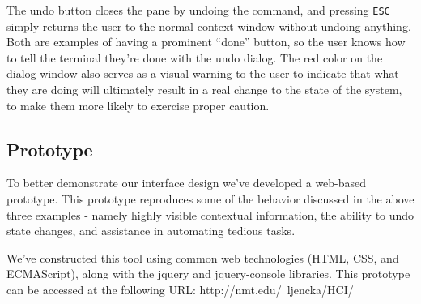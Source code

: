 The undo button closes the pane by undoing the command, and pressing
\texttt{ESC} simply returns the user to the normal context window without
undoing anything. Both are examples of having a prominent ``done'' button, so
the user knows how to tell the terminal they're done with the undo dialog. The
red color on the dialog window also serves as a visual warning to the user to
indicate that what they are doing will ultimately result in a real change to the
state of the system, to make them more likely to exercise proper caution.

\subsection{Prototype}
To better demonstrate our interface design we've developed a web-based
prototype. This prototype reproduces some of the behavior discussed in the
above three examples - namely highly visible contextual information, the ability
to undo state changes, and assistance in automating tedious tasks.

We've constructed this tool using common web technologies (HTML, CSS, and
ECMAScript), along with the jquery and jquery-console libraries. This prototype
can be accessed at the following URL: http://nmt.edu/~ljencka/HCI/


